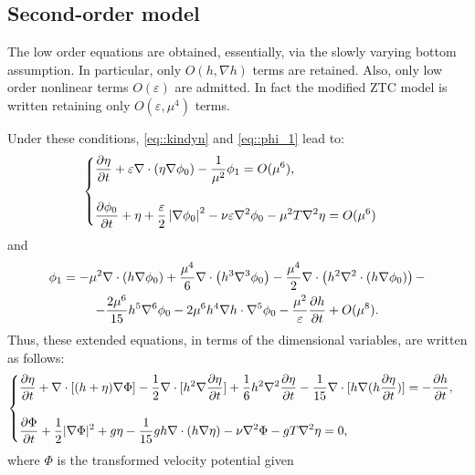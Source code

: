 \subsection{Second-order model}
The low order equations are obtained, essentially, via
the slowly varying bottom assumption. In
particular, only  \(O(h,\nabla h)\) terms are 
retained.
Also, only low order  nonlinear terms \(O(\varepsilon)\) are admitted.
In fact the modified ZTC model is  written retaining
only \(O(\varepsilon,\mu^4)\) terms.
 
Under these conditions,  \eqref{eq::kindyn}
and \eqref{eq::phi_1} lead to:
\begin{equation}\label{eq::kindyn2}
\begin{cases}
\displaystyle\frac{\partial \eta}{\partial t}+\varepsilon\nabla\cdot(\eta\nabla\phi_0)-\frac{1}{\mu^2}\phi_1=O(\mu^{6}),\\ \\
\displaystyle\frac{\partial \phi_0}{\partial t}+\eta +
\frac{\varepsilon}{2} \left|\nabla\phi_0\right|^2-\nu\varepsilon\nabla^2\phi_0-\mu^2T\nabla^2\eta
=O(\mu^{6})
\end{cases}
\end{equation}
and
\begin{multline}\label{eq::phi_2}
\phi_1=
-\mu^{2}\nabla\cdot\left(h\nabla\phi_0\right)
+\frac{\mu^{4}}{6}\nabla\cdot\left(h^3\nabla^3\phi_0\right)
-\frac{\mu^{4}}{2}\nabla\cdot\left(h^2
\nabla^2\cdot\left(h\nabla\phi_0\right) \right)-\\
-\frac{2\mu^6}{15}h^5\nabla^6\phi_0-2\mu^6h^4\nabla h\cdot\nabla^5\phi_0
-\frac{\mu^2}{\varepsilon}\frac{\partial h}{\partial t}+O(\mu^{8}).
\end{multline}
Thus, these extended equations, in terms of the dimensional
variables, are written as follows:
\begin{equation}\label{eq::ztc}
\begin{cases}
\displaystyle \frac{\partial\eta}{\partial t} +\nabla\cdot[(h+\eta)\nabla{\Phi}]
-\frac{1}{2}\nabla\cdot [h^{2}\nabla\frac{\partial \eta}
{\partial t}]
+\frac{1}{6}h^{2}\nabla^2\frac{\partial\eta}{\partial t}
-\frac{1}{15}\nabla\cdot[h\nabla(h\frac{\partial\eta}
{\partial t})]=-\frac{\partial h}{\partial t},\\ \\
\displaystyle \frac{\partial \Phi}{\partial t}
+\frac{1}{2}|\nabla\Phi|^2+g\eta-
\frac{1}{15}gh\nabla\cdot(h\nabla\eta)-\nu\nabla^2\Phi-gT\nabla^2\eta=0,
\end{cases}
\end{equation}
where  \(\Phi\) is  the transformed velocity potential given
